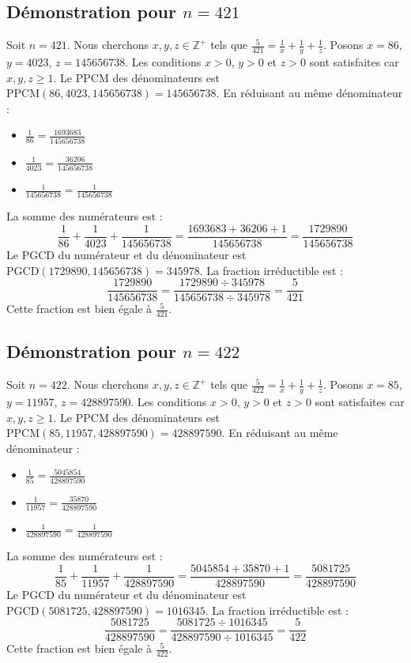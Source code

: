 \documentclass[11pt,a4paper]{article}
\begin{document}
\subsection{Démonstration pour $n = 421$}
Soit $n = 421$. Nous cherchons $x, y, z \in \mathbb{Z}^{+}$ tels que $\frac{5}{421} = \frac{1}{x} + \frac{1}{y} + \frac{1}{z}$.
Posons $x = 86$, $y = 4023$, $z = 145656738$.
Les conditions $x > 0$, $y > 0$ et $z > 0$ sont satisfaites car $x, y, z \geq 1$.
Le PPCM des dénominateurs est $\text{PPCM}(86, 4023, 145656738) = 145656738$.
En réduisant au même dénominateur :
\begin{itemize}
    \item $\frac{1}{86} = \frac{1693683}{145656738}$
    \item $\frac{1}{4023} = \frac{36206}{145656738}$
    \item $\frac{1}{145656738} = \frac{1}{145656738}$
\end{itemize}
La somme des numérateurs est :
$$ \frac{1}{86} + \frac{1}{4023} + \frac{1}{145656738} = \frac{1693683 + 36206 + 1}{145656738} = \frac{1729890}{145656738} $$
Le PGCD du numérateur et du dénominateur est $\text{PGCD}(1729890, 145656738) = 345978$.
La fraction irréductible est :
$$ \frac{1729890}{145656738} = \frac{1729890 \div 345978}{145656738 \div 345978} = \frac{5}{421} $$
Cette fraction est bien égale à $\frac{5}{421}$.

\subsection{Démonstration pour $n = 422$}
Soit $n = 422$. Nous cherchons $x, y, z \in \mathbb{Z}^{+}$ tels que $\frac{5}{422} = \frac{1}{x} + \frac{1}{y} + \frac{1}{z}$.
Posons $x = 85$, $y = 11957$, $z = 428897590$.
Les conditions $x > 0$, $y > 0$ et $z > 0$ sont satisfaites car $x, y, z \geq 1$.
Le PPCM des dénominateurs est $\text{PPCM}(85, 11957, 428897590) = 428897590$.
En réduisant au même dénominateur :
\begin{itemize}
    \item $\frac{1}{85} = \frac{5045854}{428897590}$
    \item $\frac{1}{11957} = \frac{35870}{428897590}$
    \item $\frac{1}{428897590} = \frac{1}{428897590}$
\end{itemize}
La somme des numérateurs est :
$$ \frac{1}{85} + \frac{1}{11957} + \frac{1}{428897590} = \frac{5045854 + 35870 + 1}{428897590} = \frac{5081725}{428897590} $$
Le PGCD du numérateur et du dénominateur est $\text{PGCD}(5081725, 428897590) = 1016345$.
La fraction irréductible est :
$$ \frac{5081725}{428897590} = \frac{5081725 \div 1016345}{428897590 \div 1016345} = \frac{5}{422} $$
Cette fraction est bien égale à $\frac{5}{422}$.
\end{document}
